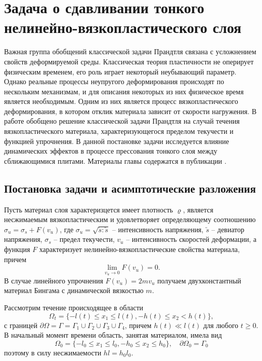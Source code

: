 \chapter{Задача о сдавливании тонкого нелинейно-вязкопластического слоя}\label{ch:ch4}
Важная группа обобщений классической задачи Прандтля \autocite{Prandtl:1948} связана с усложнением свойств деформируемой среды. Классическая теория пластичности не оперирует физическим временем, его роль играет некоторый неубывающий параметр. Однако реальные процессы неупругого деформирования происходят по нескольким механизмам, и для описания некоторых из них физическое время является необходимым. Одним из них является процесс вязкопластического деформирования, в котором отклик материала зависит от скорости нагружения. В работе \autocites{Georgievsky:2012} обобщено решение классической задачи Прандтля на случай течения вязкопластического материала, характеризующегося пределом текучести и функцией упрочнения. В данной постановке задачи исследуется влияние динамических эффектов в процессе прессования тонкого слоя между сближающимися плитами. Материалы главы содержатся в публикации .

\section{Постановка задачи и асимптотические разложения}\label{sec:ch4/sec1}

Пусть материал слоя характеризцется имеет плотность $\varrho$, является несжимаемым вязкопластическим и удовлетворяет определяющему соотношению  $\sigma_{u} = \sigma_{s} + F(v_{u})$, где $\sigma_{u} = \sqrt{\utilde{s} : \utilde{s}}$ -- интенсивность напряжения, $\utilde{s}$ -- девиатор напряжения, $\sigma_{s}$ -- предел текучести, $v_{u}$ -- интенсивность скоростей деформации, а функция $F$ характеризует нелинейно-вязкопластические свойства материала, причем
\begin{equation}
  \lim_{v_{u}\rightarrow 0}F(v_{u}) = 0.
\end{equation}
В случае линейного упрочнения $F(v_{u}) = 2 m v_{u}$ получаем двухконстантный материал Бингама с динамической вязкостью $m$.

Рассмотрим течение происходящее в области
\begin{equation}
  \Omega_{t} = \{-l(t) \le x_{1} \le l(t), -h(t) \le x_{2} < h(t)\},
\end{equation}
с границей $\partial\Omega = \Gamma = \Gamma_{1} \cup \Gamma_{2} \cup \Gamma_{3} \cup \Gamma_{4}$, причем $h(t) \ll l(t)$ для любого $t \ge 0$.
В начальный момент времени область, занятая материалом, имела вид
\begin{equation}
  \Omega_{0} = \{-l_{0} \le x_{1} \le l_{0}, -h_{0} \le x_{2} \le h_{0}\}, \quad \partial\Omega_{0} = \Gamma_{0}
\end{equation}
поэтому в силу несжимаемости $h l=h_{0} l_{0}$.

